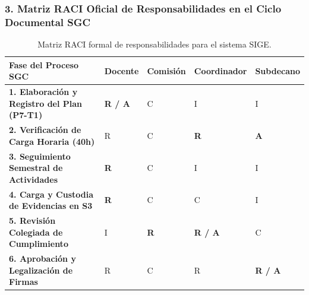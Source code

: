 \documentclass[12pt,a4paper]{article}
\begin{document}
\subsubsection*{3. Matriz RACI Oficial de Responsabilidades en el Ciclo Documental SGC}
\begin{table}[H]
\centering
\small
\renewcommand{\arraystretch}{1.2}
\begin{tabularx}{\textwidth}{|>{\hsize=1.2\hsize\raggedright\arraybackslash\bfseries\footnotesize}X|>{\hsize=0.7\hsize\centering\arraybackslash\footnotesize}X|>{\hsize=0.7\hsize\centering\arraybackslash\footnotesize}X|>{\hsize=0.7\hsize\centering\arraybackslash\footnotesize}X|>{\hsize=0.7\hsize\centering\arraybackslash\footnotesize}X|}
\hline
\rowcolor{tableheader}
\textbf{Fase del Proceso SGC} & \textbf{Docente} & \textbf{Comisión} & \textbf{Coordinador} & \textbf{Subdecano} \\
\hline
1. Elaboración y Registro del Plan (P7-T1) & \textbf{R / A} & C & I & I \\
\hline
2. Verificación de Carga Horaria (40h) & R & C & \textbf{R} & \textbf{A} \\
\hline
3. Seguimiento Semestral de Actividades & \textbf{R} & C & I & I \\
\hline
4. Carga y Custodia de Evidencias en S3 & \textbf{R} & C & C & I \\
\hline
5. Revisión Colegiada de Cumplimiento & I & \textbf{R} & \textbf{R / A} & C \\
\hline
6. Aprobación y Legalización de Firmas & R & C & R & \textbf{R / A} \\
\hline
\end{tabularx}
\caption{Matriz RACI formal de responsabilidades para el sistema SIGE.}
\end{table}
\end{document}
